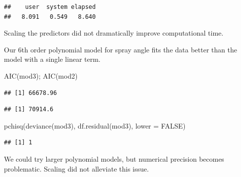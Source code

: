 \documentclass[
  ignorenonframetext,
]{beamer}
\newenvironment{Shaded}{\begin{snugshade}}{\end{snugshade}}
\newcommand{\AttributeTok}[1]{\textcolor[rgb]{0.77,0.63,0.00}{#1}}
\newcommand{\ConstantTok}[1]{\textcolor[rgb]{0.00,0.00,0.00}{#1}}
\newcommand{\FunctionTok}[1]{\textcolor[rgb]{0.00,0.00,0.00}{#1}}
\newcommand{\NormalTok}[1]{#1}
\begin{document}
\begin{frame}[fragile]{}
\begin{verbatim}
##    user  system elapsed 
##   8.091   0.549   8.640
\end{verbatim}

\vspace{12pt}
\normalsize

Scaling the predictors did not dramatically improve computational time.
\end{frame}

\begin{frame}[fragile]{}
\protect\hypertarget{section-13}{}
Our 6th order polynomial model for spray angle fits the data better than
the model with a single linear term.

\vspace{12pt}
\tiny

\begin{Shaded}
\begin{Highlighting}[]
\FunctionTok{AIC}\NormalTok{(mod3); }\FunctionTok{AIC}\NormalTok{(mod2)}
\end{Highlighting}
\end{Shaded}

\begin{verbatim}
## [1] 66678.96
\end{verbatim}

\begin{verbatim}
## [1] 70914.6
\end{verbatim}

\begin{Shaded}
\begin{Highlighting}[]
\FunctionTok{pchisq}\NormalTok{(}\FunctionTok{deviance}\NormalTok{(mod3), }\FunctionTok{df.residual}\NormalTok{(mod3), }\AttributeTok{lower =} \ConstantTok{FALSE}\NormalTok{)}
\end{Highlighting}
\end{Shaded}

\begin{verbatim}
## [1] 1
\end{verbatim}

\vspace{12pt}
\normalsize

We could try larger polynomial models, but numerical precision becomes
problematic. Scaling did not alleviate this issue.
\end{frame}
\end{document}
